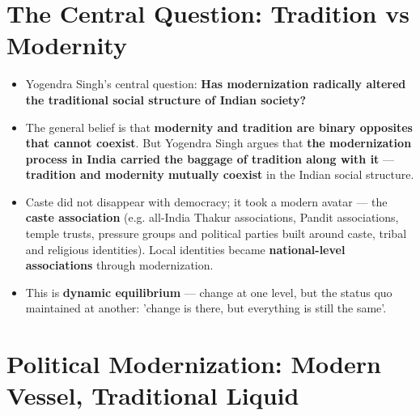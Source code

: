 \section{The Central Question: Tradition vs Modernity}

\begin{KeyConcept}
\begin{itemize}
\item Yogendra Singh's central question: \textbf{Has modernization radically altered the traditional social structure of Indian society?}
\item The general belief is that \textbf{modernity and tradition are binary opposites that cannot coexist}. But Yogendra Singh argues that \textbf{the modernization process in India carried the baggage of tradition along with it} --- \textbf{tradition and modernity mutually coexist} in the Indian social structure.
\end{itemize}
\end{KeyConcept}

\begin{ExampleBox}
\begin{itemize}
\item Caste did not disappear with democracy; it took a modern avatar --- the \textbf{caste association} (e.g. all-India Thakur associations, Pandit associations, temple trusts, pressure groups and political parties built around caste, tribal and religious identities). Local identities became \textbf{national-level associations} through modernization.
\item This is \textbf{dynamic equilibrium} --- change at one level, but the status quo maintained at another: 'change is there, but everything is still the same'.
\end{itemize}
\end{ExampleBox}

\section{Political Modernization: Modern Vessel, Traditional Liquid}

